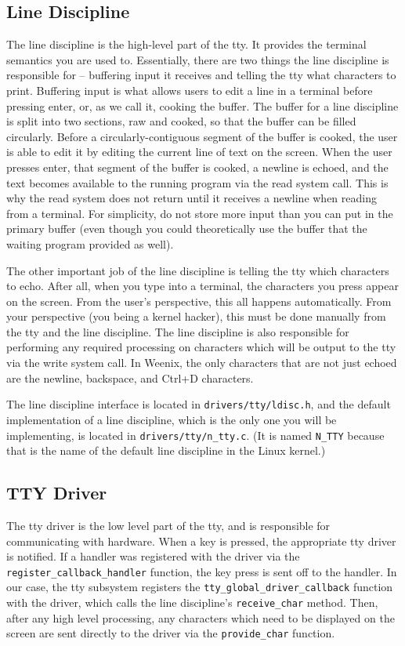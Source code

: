 \subsection{Line Discipline}
The line discipline is the high-level part of the tty. It provides the terminal semantics you are used to. Essentially, there are two things the line discipline is responsible for -- buffering input it receives and telling the tty what characters to print. Buffering input is what allows users to edit a line in a terminal before pressing enter, or, as we call it, cooking the buffer. The buffer for a line discipline is split into two sections, raw and cooked, so that the buffer can be filled circularly. Before a circularly-contiguous segment of the buffer is cooked, the user is able to edit it by editing the current line of text on the screen. When the user presses enter, that segment of the buffer is cooked, a newline is echoed, and the text becomes available to the running program via the read system call. This is why the read system does not return until it receives a newline when reading from a terminal. For simplicity, do not store more input than you can put in the primary buffer (even though you could theoretically use the buffer that the waiting program provided as well).

The other important job of the line discipline is telling the tty which characters to echo. After all, when you type into a terminal, the characters you press appear on the screen. From the user's perspective, this all happens automatically. From your perspective (you being a kernel hacker), this must be done manually from the tty and the line discipline. The line discipline is also responsible for performing any required processing on characters which will be output to the tty via the write system call. In Weenix, the only characters that are not just echoed are the newline, backspace, and Ctrl+D characters.

The line discipline interface is located in \texttt{drivers/tty/ldisc.h}, and the default implementation of a line discipline, which is the only one you will be implementing, is located in \texttt{drivers/tty/n\_tty.c}. (It is named \texttt{N\_TTY} because that is the name of the default line discipline in the Linux kernel.) 

\subsection{TTY Driver}
The tty driver is the low level part of the tty, and is responsible for communicating with hardware. When a key is pressed, the appropriate tty driver is notified. If a handler was registered with the driver via the \texttt{register\_callback\_handler} function, the key press is sent off to the handler. In our case, the tty subsystem registers the \texttt{tty\_global\_driver\_callback} function with the driver, which calls the line discipline's \texttt{receive\_char} method. Then, after any high level processing, any characters which need to be displayed on the screen are sent directly to the driver via the \texttt{provide\_char} function.

